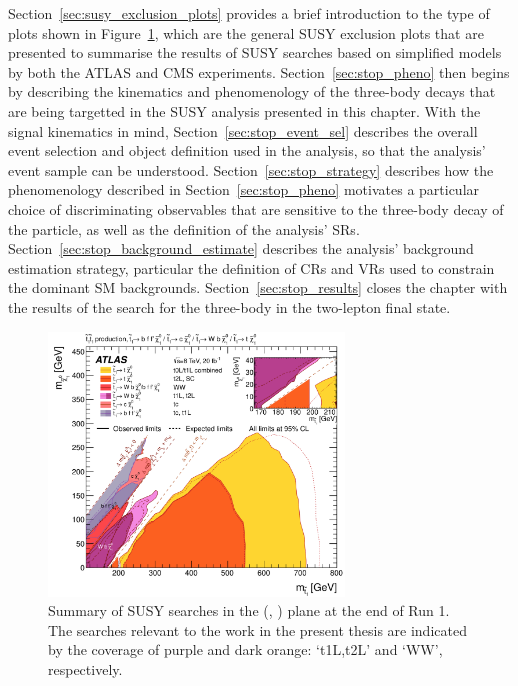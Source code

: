Section~\ref{sec:susy_exclusion_plots} provides a brief introduction to the type of plots
shown in Figure~\ref{fig:run1_stop_summary}, which are the general SUSY exclusion plots
that are presented to summarise the results of SUSY searches based on simplified models
by both the ATLAS and CMS experiments.
Section~\ref{sec:stop_pheno} then begins by describing the kinematics and phenomenology of the three-body \stopone
decays that are being targetted in the SUSY analysis presented in this chapter.
With the signal kinematics in mind, Section~\ref{sec:stop_event_sel} describes the overall event
selection and object definition used in the analysis, so that the analysis' event sample can be understood.
Section~\ref{sec:stop_strategy} describes how the phenomenology described in Section~\ref{sec:stop_pheno}
motivates a particular choice of discriminating observables that are sensitive to the three-body decay
of the \stopone particle, as well as the definition of the analysis' SRs.
Section~\ref{sec:stop_background_estimate} describes the analysis' background estimation
strategy, particular the definition of CRs and VRs used to constrain the dominant
SM backgrounds.
Section~\ref{sec:stop_results} closes the chapter with the results of the search for
the three-body \stopone in the two-lepton final state.


\begin{figure}[!htb]
    \begin{center}
        \includegraphics[width=0.7\textwidth]{figures/search_stop2l/run1_stop_summary}
        \caption{
            Summary of SUSY \stopone searches in the (\stopone, \ninoone) plane
            at the end of Run 1.
            The searches relevant to the work in the present thesis are indicated by the 
            coverage of purple and dark orange: `t1L,t2L' and `WW', respectively.
        }
        \label{fig:run1_stop_summary}
    \end{center}
\end{figure}

